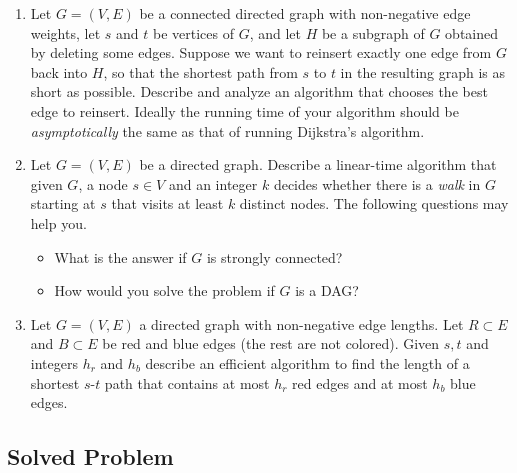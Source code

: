 \documentclass[11pt]{article}
\begin{document}
\begin{enumerate}


\item Let $G = (V, E)$ be a connected directed graph with non-negative
  edge weights, let $s$ and $t$ be vertices of $G$, and let $H$ be a
  subgraph of $G$ obtained by deleting some edges.  Suppose we want to
  reinsert exactly one edge from $G$ back into $H$, so that the
  shortest path from $s$ to $t$ in the resulting graph is as short as
  possible. Describe and analyze an algorithm that chooses the best
  edge to reinsert. Ideally the running time of your algorithm should
  be {\em asymptotically} the same as that of running Dijkstra's algorithm.

\item Let $G=(V,E)$ be a directed graph. Describe a linear-time algorithm
that given $G$, a node $s \in V$ and an integer $k$ decides whether
there is a {\em walk} in $G$ starting at $s$ that visits at least $k$ distinct
nodes. The following questions may help you.
\begin{itemize}
\item What is the answer if $G$ is strongly connected?
\item How would you solve the problem if $G$ is a DAG?
\end{itemize}

\item Let $G=(V,E)$ a directed graph with non-negative edge
  lengths. Let $R \subset E$ and $B \subset E$ be red and blue edges
  (the rest are not colored).  Given $s,t$ and integers $h_r$ and
  $h_b$ describe an efficient algorithm to find the length of a
  shortest $s$-$t$ path that contains at most $h_r$ red edges and at
  most $h_b$ blue edges.
\end{enumerate}

\vspace{1in}
\subsection*{Solved Problem}
\end{document}
